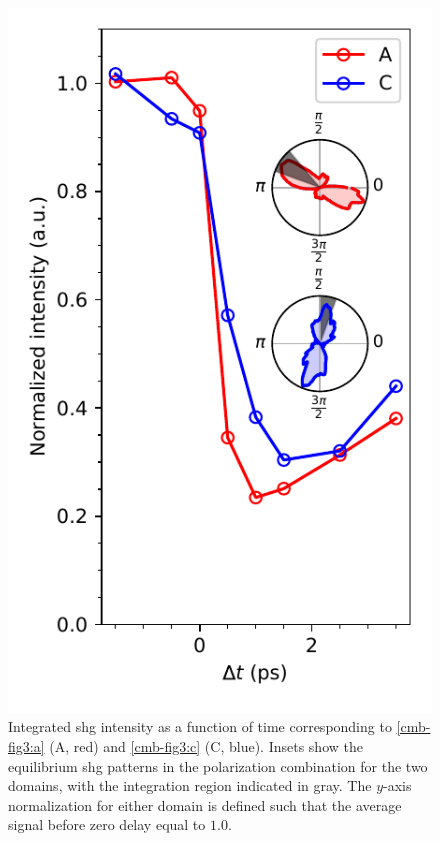 \begin{figure}
\centering
\includegraphics{./gfx/ch6/quenchtimes.pdf}
\captionsetup{singlelinecheck=off}
\caption[Comparison of quench times in different domains]{
\label{cmb-quenchtimes}
Integrated \gls{shg} intensity as a function of time corresponding to \cref{cmb-fig3:a} (A, red) and \cref{cmb-fig3:c} (C, blue).
Insets show the equilibrium \gls{shg} patterns in the \PP polarization combination for the two domains, with the integration region indicated in gray.
The $y$-axis normalization for either domain is defined such that the average signal before zero delay equal to $1.0$.
}
\end{figure}

